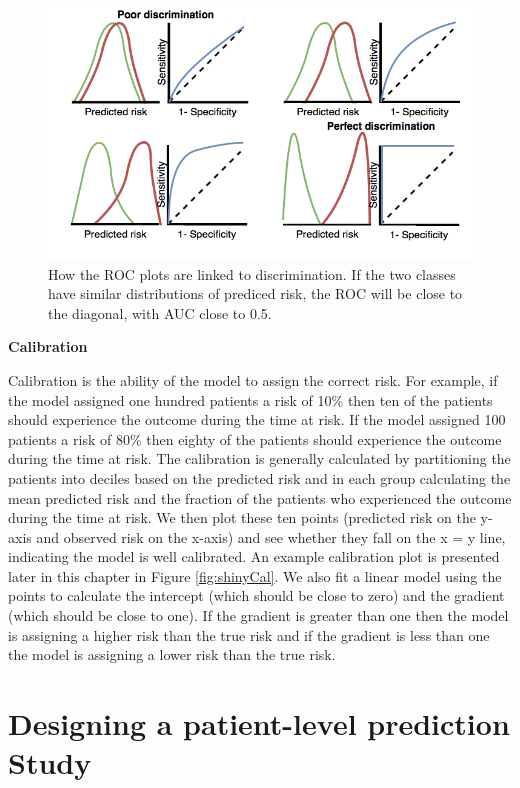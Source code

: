 \documentclass[11pt]{book}
\theoremstyle{definition}
\theoremstyle{definition}
\theoremstyle{definition}
\theoremstyle{remark}
\begin{document}
\begin{figure}
\includegraphics[width=1\linewidth]{images/PatientLevelPrediction/theory/roctheory} \caption{How the ROC plots are linked to discrimination. If the two classes have similar distributions of prediced risk, the ROC will be close to the diagonal, with AUC close to 0.5.}\label{fig:figuretheoryroctheory}
\end{figure}

\textbf{Calibration}

Calibration is the ability of the model to assign the correct risk. For example, if the model assigned one hundred patients a risk of 10\% then ten of the patients should experience the outcome during the time at risk. If the model assigned 100 patients a risk of 80\% then eighty of the patients should experience the outcome during the time at risk. The calibration is generally calculated by partitioning the patients into deciles based on the predicted risk and in each group calculating the mean predicted risk and the fraction of the patients who experienced the outcome during the time at risk. We then plot these ten points (predicted risk on the y-axis and observed risk on the x-axis) and see whether they fall on the x = y line, indicating the model is well calibrated. An example calibration plot is presented later in this chapter in Figure \ref{fig:shinyCal}. We also fit a linear model using the points to calculate the intercept (which should be close to zero) and the gradient (which should be close to one). If the gradient is greater than one then the model is assigning a higher risk than the true risk and if the gradient is less than one the model is assigning a lower risk than the true risk.

\hypertarget{designing-a-patient-level-prediction-study}{%
\section{Designing a patient-level prediction Study}\label{designing-a-patient-level-prediction-study}}
\end{document}
